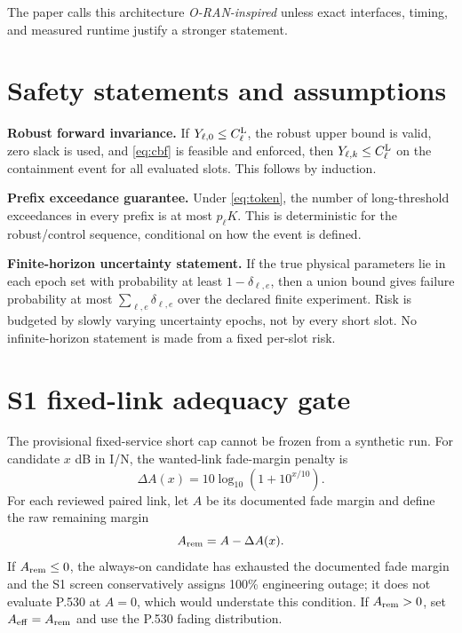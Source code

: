 \documentclass[11pt]{article}
\begin{document}
The paper calls this architecture \emph{O-RAN-inspired} unless exact interfaces, timing, and measured runtime justify a stronger statement.

\section{Safety statements and assumptions}

\textbf{Robust forward invariance.} If $Y_{\ell,0}\le C_\ell^{\rm L}$, the robust upper bound is valid, zero slack is used, and \eqref{eq:cbf} is feasible and enforced, then $Y_{\ell,k}\le C_\ell^{\rm L}$ on the containment event for all evaluated slots. This follows by induction.

\textbf{Prefix exceedance guarantee.} Under \eqref{eq:token}, the number of long-threshold exceedances in every prefix is at most $p_\ell K$. This is deterministic for the robust/control sequence, conditional on how the event is defined.

\textbf{Finite-horizon uncertainty statement.} If the true physical parameters lie in each epoch set with probability at least $1-\delta_{\ell,e}$, then a union bound gives failure probability at most $\sum_{\ell,e}\delta_{\ell,e}$ over the declared finite experiment. Risk is budgeted by slowly varying uncertainty epochs, not by every short slot. No infinite-horizon statement is made from a fixed per-slot risk.

\section{S1 fixed-link adequacy gate}

The provisional fixed-service short cap cannot be frozen from a synthetic run. For candidate $x$ dB in I/N, the wanted-link fade-margin penalty is
\begin{equation}
 \Delta A(x)=10\log_{10}\left(1+10^{x/10}\right).
 \label{eq:penalty}
\end{equation}
For each reviewed paired link, let $A$ be its documented fade margin and define the raw remaining margin
\begin{equation}
 A_{\rm rem}=A-\Delta A(x).
\end{equation}
If $A_{\rm rem}\le0$, the always-on candidate has exhausted the documented fade margin and the S1 screen conservatively assigns 100\% engineering outage; it does not evaluate P.530 at $A=0$, which would understate this condition. If $A_{\rm rem}>0$, set $A_{\rm eff}=A_{\rm rem}$ and use the P.530 fading distribution.
\end{document}
